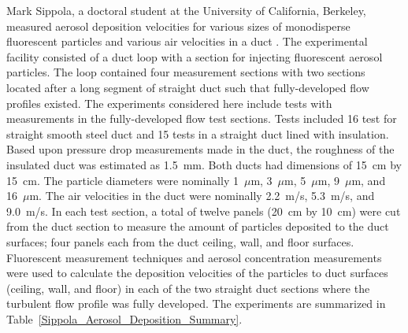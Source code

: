 Mark Sippola, a doctoral student at the University of California, Berkeley, measured aerosol deposition velocities for various sizes of monodisperse fluorescent particles and various air velocities in a duct \cite{Sippola:2002,Sippola:2010}. The experimental facility consisted of a duct loop with a section for injecting fluorescent aerosol particles. The loop contained four measurement sections with two sections located after a long segment of straight duct such that fully-developed flow profiles existed. The experiments considered here include tests with measurements in the fully-developed flow test sections. Tests included 16 test for straight smooth steel duct and 15 tests in a straight duct lined with insulation. Based upon pressure drop measurements made in the duct, the roughness of the insulated duct was estimated as 1.5~mm. Both ducts had dimensions of 15~cm by 15~cm. The particle diameters were nominally 1~$\mu$m, 3~$\mu$m, 5~$\mu$m, 9~$\mu$m, and 16~$\mu$m. The air velocities in the duct were nominally 2.2~m/s, 5.3~m/s, and 9.0~m/s. In each test section, a total of twelve panels (20~cm by 10~cm) were cut from the duct section to measure the amount of particles deposited to the duct surfaces; four panels each from the duct ceiling, wall, and floor surfaces. Fluorescent measurement techniques and aerosol concentration measurements were used to calculate the deposition velocities of the particles to duct surfaces (ceiling, wall, and floor) in each of the two straight duct sections where the turbulent flow profile was fully developed. The experiments are summarized in Table~\ref{Sippola_Aerosol_Deposition_Summary}.

